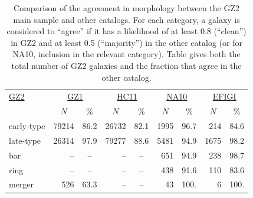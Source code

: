 \documentclass[useAMS,usenatbib]{mn2e}
\begin{document}
\begin{table}
\centering
 \begin{tabular}{@{}lrcrcrcrc}
 \hline
\multicolumn{1}{l}{\underline{GZ2}} &
\multicolumn{2}{c}{\underline{GZ1}} &
\multicolumn{2}{c}{\underline{HC11}} &
\multicolumn{2}{c}{\underline{NA10}} &
\multicolumn{2}{c}{\underline{EFIGI}}
\\ 
\multicolumn{1}{l}{} &
\multicolumn{1}{c}{$N$} &
\multicolumn{1}{c}{\%} &
\multicolumn{1}{c}{$N$} &
\multicolumn{1}{c}{\%} &
\multicolumn{1}{c}{$N$} &
\multicolumn{1}{c}{\%} &
\multicolumn{1}{c}{$N$} &
\multicolumn{1}{c}{\%}
\\ 
\hline					
early-type     & 79214    & 86.2     & 26732    & 82.1   & 1995    & 96.7    & 214     & 84.6       \\
late-type      & 26314    & 97.9     & 79277    & 88.6   & 5481    & 94.9    & 1675    & 98.2       \\
bar            & --       &  --      & --       &  --    & 651     & 94.9    & 238     & 98.7       \\
ring           & --       &  --      & --       &  --    & 438     & 91.6    & 110     & 83.6       \\
merger         & 526      & 63.3     & --       &  --    & 43      & 100.    & 6       & 100.       \\
\hline
 \end{tabular}
 \caption{Comparison of the agreement in morphology between the GZ2 main sample and other catalogs. For each category, a galaxy is considered to ``agree'' if it has a likelihood of at least 0.8 (``clean'') in GZ2 and at least 0.5 (``majority'') in the other catalog (or for NA10, inclusion in the relevant category). Table gives both the total number of GZ2 galaxies and the fraction that agree in the other catalog. \label{tbl-compare}}
\end{table}

\end{document}
